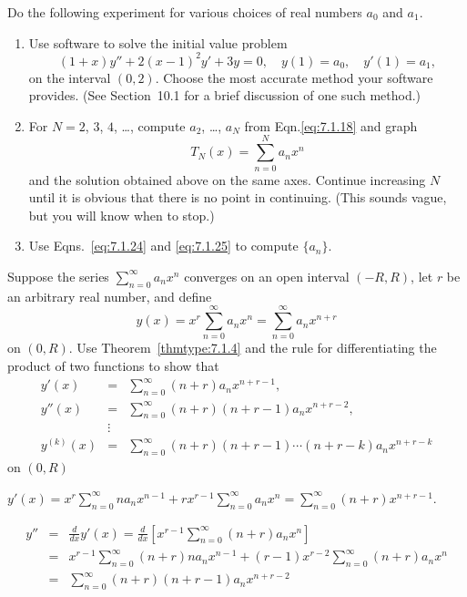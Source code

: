 \documentclass{ximera}
\begin{document}
\begin{problem}\label{exer:7.1.19}  
Do the following experiment for various choices of
real numbers  $a_0$ and $a_1$.
\begin{enumerate}
\item %
Use software  to solve the initial value problem
$$
(1+x)y''+2(x-1)^2y'+3y=0,\quad y(1)=a_0,\quad y'(1)=a_1,
$$
on the interval $(0,2)$. Choose the most accurate method
your software provides.
(See Section~10.1 for a brief discussion of one such
method.)
\item %
For $N=2$, $3$, $4$, \dots, compute $a_2$, \dots, $a_N$
from Eqn.\eqref{eq:7.1.18} and graph
$$
T_N(x)=\sum_{n=0}^N a_nx^n
$$
and the solution obtained above on the same axes.
Continue increasing $N$ until it is obvious that there is
no point in continuing.
(This sounds vague, but you will know when to stop.)
\item Use Eqns.~\eqref{eq:7.1.24} and \eqref{eq:7.1.25}
to compute $\{a_n\}$.
\end{enumerate}
\end{problem}

\begin{problem}\label{exer:7.1.20}
Suppose the series $\sum_{n=0}^\infty a_nx^n$ converges on an
open interval $(-R,R)$, let $r$ be an arbitrary real number, and
define
$$
y(x)=x^r\sum_{n=0}^\infty a_nx^n=\sum_{n=0}^\infty a_nx^{n+r}
$$
on $(0,R)$. Use Theorem~\ref{thmtype:7.1.4} and the rule for
differentiating the product of two functions to show that
\begin{eqnarray*}
y'(x)&=&\sum_{n=0}^\infty  (n+r)a_nx^{n+r-1},\\
y''(x)&=&\sum_{n=0}^\infty(n+r)(n+r-1)a_nx^{n+r-2},\\
&\vdots&\\
y^{(k)}(x)&=&\sum_{n=0}^\infty(n+r)(n+r-1)\cdots(n+r-k)a_nx^{n+r-k}
\end{eqnarray*}
on $(0,R)$

\begin{solution}
    $y'(x)=x^r\sum_{n=0}^\infty na_nx^{n-1}+rx^{r-1}\sum_{n=0}^\infty
a_nx^n=\sum_{n=0}^\infty (n+r)x^{n+r-1}$.

\begin{eqnarray*}y''&=&\frac{d}{ dx}y'(x)=\frac{d}{ dx}\left[x^{r-1}\sum_{n=0}^\infty
(n+r)a_nx^n\right]\\
&=&x^{r-1}\sum_{n=0}^\infty (n+r)na_nx^{n-1}+
(r-1)x^{r-2}\sum_{n=0}^\infty (n+r)a_nx^n\\
&=&\sum_{n=0}^\infty
(n+r)(n+r-1)a_nx^{n+r-2}
\end{eqnarray*}
\end{solution}
\end{problem}
\end{document}
